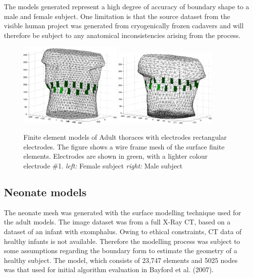 \documentclass[12pt]{iopart}
\begin{document}
The models generated represent a high degree of accuracy of boundary
shape to a male and female subject.  One limitation is that the
source dataset from the visible
human project was generated from cryogenically frozen cadavers and
will therefore be subject to any anatomical inconsistencies arising from
the process.


\begin{figure}[bhtp]
\begin{center}
  \includegraphics[width= 0.45\textwidth]
         {figures/female_t_mdl.png}
  \includegraphics[width= 0.45\textwidth]
         {figures/male_t_mdl.png}
\caption{ \label{fig:AdultFEM}
Finite element models of Adult thoraces with electrodes
rectangular electrodes. The figure shows a wire frame mesh
of the surface finite elements. Electrodes are shown in green,
with a lighter colour electrode \#1.
{\em left:} Female subject
{\em right:} Male subject
}
\end{center}
\end{figure}


\subsection{Neonate models}

The neonate mesh was generated with the surface modelling
technique used for the adult models. The image dataset
was from a full X-Ray CT, based on a 
dataset of an infant with exomphalus. Owing to
ethical constraints, CT data of healthy infants is not 
available. Therefore the modelling process was subject to
some assumptions regarding the boundary form to estimate
the geometry of a healthy subject.  The model, which
consists of 23,747 elements and 5025 nodes was that used
for initial algorithm evaluation in Bayford et al. (2007).
\end{document}
